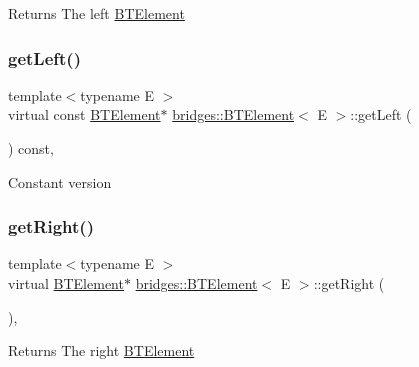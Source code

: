 \begin{DoxyReturn}{Returns}
The left \hyperlink{classbridges_1_1_b_t_element}{B\+T\+Element} 
\end{DoxyReturn}
\hypertarget{classbridges_1_1_b_t_element_a01ebba851e9cc6ec77df16201604597a}{}\label{classbridges_1_1_b_t_element_a01ebba851e9cc6ec77df16201604597a} 
\subsubsection{\texorpdfstring{get\+Left()}{getLeft()}\hspace{0.1cm}{\footnotesize\ttfamily [2/2]}}
{\footnotesize\ttfamily template$<$typename E $>$ \\
virtual const \hyperlink{classbridges_1_1_b_t_element}{B\+T\+Element}$\ast$ \hyperlink{classbridges_1_1_b_t_element}{bridges\+::\+B\+T\+Element}$<$ E $>$\+::get\+Left (\begin{DoxyParamCaption}{ }\end{DoxyParamCaption}) const\hspace{0.3cm}{\ttfamily [inline]}, {\ttfamily [virtual]}}

Constant version \hypertarget{classbridges_1_1_b_t_element_a931de8a71c04479a4aa0885ecee2a855}{}\label{classbridges_1_1_b_t_element_a931de8a71c04479a4aa0885ecee2a855} 
\subsubsection{\texorpdfstring{get\+Right()}{getRight()}\hspace{0.1cm}{\footnotesize\ttfamily [1/2]}}
{\footnotesize\ttfamily template$<$typename E $>$ \\
virtual \hyperlink{classbridges_1_1_b_t_element}{B\+T\+Element}$\ast$ \hyperlink{classbridges_1_1_b_t_element}{bridges\+::\+B\+T\+Element}$<$ E $>$\+::get\+Right (\begin{DoxyParamCaption}{ }\end{DoxyParamCaption})\hspace{0.3cm}{\ttfamily [inline]}, {\ttfamily [virtual]}}

\begin{DoxyReturn}{Returns}
The right \hyperlink{classbridges_1_1_b_t_element}{B\+T\+Element} 
\end{DoxyReturn}
\hypertarget{classbridges_1_1_b_t_element_ad3b12cd9fa6f3f18fb66c07dbc73a409}{}\label{classbridges_1_1_b_t_element_ad3b12cd9fa6f3f18fb66c07dbc73a409} 
